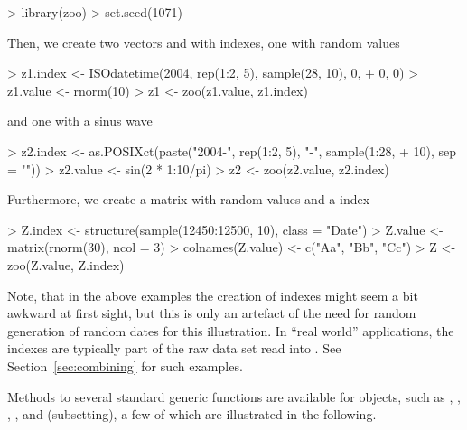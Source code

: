 \documentclass{Z}
\begin{document}
\begin{Schunk}
\begin{Sinput}
> library(zoo)
> set.seed(1071)
\end{Sinput}
\end{Schunk}

Then, we create two vectors  and  with  
indexes, one with random values
\begin{Schunk}
\begin{Sinput}
> z1.index <- ISOdatetime(2004, rep(1:2, 5), sample(28, 10), 0, 
+     0, 0)
> z1.value <- rnorm(10)
> z1 <- zoo(z1.value, z1.index)
\end{Sinput}
\end{Schunk}
and one with a sinus wave
\begin{Schunk}
\begin{Sinput}
> z2.index <- as.POSIXct(paste("2004-", rep(1:2, 5), "-", sample(1:28, 
+     10), sep = ""))
> z2.value <- sin(2 * 1:10/pi)
> z2 <- zoo(z2.value, z2.index)
\end{Sinput}
\end{Schunk}
Furthermore, we create a matrix  with random values and a 
index
\begin{Schunk}
\begin{Sinput}
> Z.index <- structure(sample(12450:12500, 10), class = "Date")
> Z.value <- matrix(rnorm(30), ncol = 3)
> colnames(Z.value) <- c("Aa", "Bb", "Cc")
> Z <- zoo(Z.value, Z.index)
\end{Sinput}
\end{Schunk}
Note, that in the above examples the creation of indexes might seem a bit awkward
at first sight, but this is only an artefact of the need for random generation
of random dates for this illustration. In ``real world'' applications, the indexes
are typically part of the raw data set read into . See Section~\ref{sec:combining}
for such examples.

Methods to several standard generic functions are available for
 objects, such as , , , ,
 and \code{[} (subsetting), a few of which are illustrated in
the following. 
\end{document}
